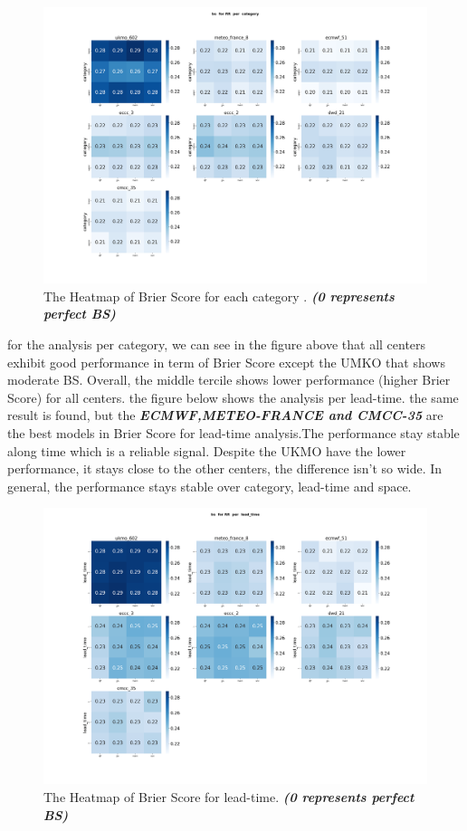\begin{figure}[H]
    \centering
    \includegraphics[scale=0.25]{plots/prob/bs/bs_RR_category.png}
    \caption{The Heatmap of Brier Score for each category  . \textbf{\textit{(0 represents perfect BS)}}}
\end{figure}

for the analysis per category, we can see in the figure above that all centers exhibit good performance in term of Brier Score except the UMKO that shows moderate BS. Overall, the middle tercile shows lower performance (higher Brier Score) for all centers. 
the figure below shows the analysis per lead-time. the same result is found, but the \textbf{\textit{ECMWF,METEO-FRANCE and CMCC-35}} are the best models in Brier Score for lead-time analysis.The performance stay stable along time which is a reliable signal. Despite the UKMO have the lower performance, it stays close to the other centers, the difference isn't so wide. 
In general, the performance stays stable over category, lead-time and space.


\begin{figure}[H]
    \centering
    \includegraphics[scale=0.25]{plots/prob/bs/bs_RR_lead_time.png}
    \caption{The Heatmap of Brier Score for lead-time. \textbf{\textit{(0 represents perfect BS)}}}
\end{figure}



